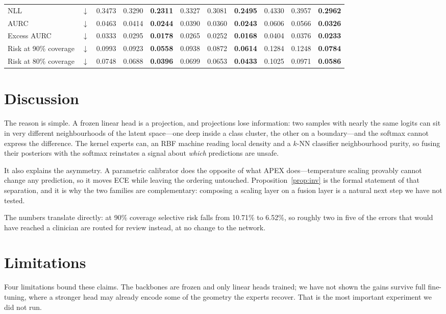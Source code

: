 \documentclass[conference]{IEEEtran}
\begin{document}
\begin{table}[t]
\begin{tabular}{l c *{3}{ccc}}
NLL & $\downarrow$ & 0.3473 & 0.3290 & \textbf{0.2311} & 0.3327 & 0.3081 & \textbf{0.2495} & 0.4330 & 0.3957 & \textbf{0.2962} \\
AURC & $\downarrow$ & 0.0463 & 0.0414 & \textbf{0.0244} & 0.0390 & 0.0360 & \textbf{0.0243} & 0.0606 & 0.0566 & \textbf{0.0326} \\
Excess AURC & $\downarrow$ & 0.0333 & 0.0295 & \textbf{0.0178} & 0.0265 & 0.0252 & \textbf{0.0168} & 0.0404 & 0.0376 & \textbf{0.0233} \\
Risk at 90\% coverage & $\downarrow$ & 0.0993 & 0.0923 & \textbf{0.0558} & 0.0938 & 0.0872 & \textbf{0.0614} & 0.1284 & 0.1248 & \textbf{0.0784} \\
Risk at 80\% coverage & $\downarrow$ & 0.0748 & 0.0688 & \textbf{0.0396} & 0.0699 & 0.0653 & \textbf{0.0433} & 0.1025 & 0.0971 & \textbf{0.0586} \\
\bottomrule
\end{tabular}
\end{table}


\section{Discussion}

The reason is simple. A frozen linear head is a projection, and projections lose
information: two samples with nearly the same logits can sit
in very different neighbourhoods of the latent space---one deep inside a class
cluster, the other on a boundary---and the softmax cannot express the difference.
The kernel experts can, an RBF machine reading local density and a $k$-NN
classifier neighbourhood purity, so fusing their posteriors with the softmax
reinstates a signal about \emph{which} predictions are unsafe.

It also explains the asymmetry. A parametric calibrator does the opposite of what
APEX does---temperature scaling provably cannot change any prediction, so it moves
ECE while leaving the ordering untouched. Proposition~\ref{prop:inv} is the formal
statement of that separation, and it is why the two families are complementary:
composing a scaling layer on a fusion layer is a natural next step we have not
tested.

The numbers translate directly: at 90\% coverage selective risk falls from 10.71\%
to 6.52\%, so roughly two in five of the errors that would have reached a clinician
are routed for review instead, at no change to the network.

\section{Limitations}
\label{sec:limits}
Four limitations bound these claims. The backbones are frozen and only linear heads
trained; we have not shown the gains survive full fine-tuning, where a stronger
head may already encode some of the geometry the experts recover. That is the most
important experiment we did not run.
\end{document}
